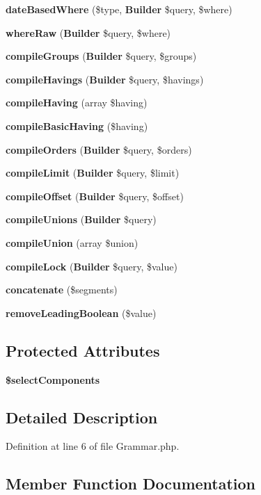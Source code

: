 \begin{DoxyCompactItemize}
{\bf date\+Based\+Where} (\$type, {\bf Builder} \$query, \$where)
\item 
{\bf where\+Raw} ({\bf Builder} \$query, \$where)
\item 
{\bf compile\+Groups} ({\bf Builder} \$query, \$groups)
\item 
{\bf compile\+Havings} ({\bf Builder} \$query, \$havings)
\item 
{\bf compile\+Having} (array \$having)
\item 
{\bf compile\+Basic\+Having} (\$having)
\item 
{\bf compile\+Orders} ({\bf Builder} \$query, \$orders)
\item 
{\bf compile\+Limit} ({\bf Builder} \$query, \$limit)
\item 
{\bf compile\+Offset} ({\bf Builder} \$query, \$offset)
\item 
{\bf compile\+Unions} ({\bf Builder} \$query)
\item 
{\bf compile\+Union} (array \$union)
\item 
{\bf compile\+Lock} ({\bf Builder} \$query, \$value)
\item 
{\bf concatenate} (\$segments)
\item 
{\bf remove\+Leading\+Boolean} (\$value)
\end{DoxyCompactItemize}
\subsection*{Protected Attributes}
\begin{DoxyCompactItemize}
\item 
{\bf \$select\+Components}
\end{DoxyCompactItemize}


\subsection{Detailed Description}


Definition at line 6 of file Grammar.\+php.



\subsection{Member Function Documentation}
